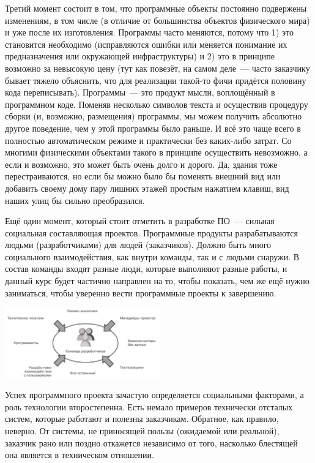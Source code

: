\documentclass{../../text-style}
\begin{document}
Третий момент состоит в том, что программные объекты постоянно подвержены изменениям, в том числе (в отличие от большинства объектов физического мира) и уже после их изготовления. Программы часто меняются, потому что 1) это становится необходимо (исправляются ошибки или меняется понимание их предназначения или окружающей инфраструктуры) и 2) это в принципе возможно за невысокую цену (тут как повезёт, на самом деле~--- часто заказчику бывает тяжело объяснить, что для реализации такой-то фичи придётся половину кода переписывать). Программы~--- это продукт мысли, воплощённый в программном коде. Поменяв несколько символов текста и осуществив процедуру сборки (и, возможно, размещения) программы, мы можем получить абсолютно другое поведение, чем у этой программы было раньше. И всё это чаще всего в полностью автоматическом режиме и практически без каких-либо затрат. Со многими физическими объектами такого в принципе осуществить невозможно, а если и возможно, это может быть очень долго и дорого. Да, здания тоже перестраиваются, но если бы можно было бы поменять внешний вид или добавить своему дому пару лишних этажей простым нажатием клавиш, вид наших улиц бы сильно преобразился. 

Ещё один момент, который стоит отметить в разработке ПО~--- сильная социальная составляющая проектов. Программные продукты разрабатываются людьми (разработчиками) для людей (заказчиков). Должно быть много социального взаимодействия, как внутри команды, так и с людьми снаружи. В состав команды входят разные люди, которые выполняют разные работы, и данный курс будет частично направлен на то, чтобы показать, чем же ещё нужно заниматься, чтобы уверенно вести программные проекты к завершению.

\begin{center}
    \includegraphics[width=0.5\textwidth]{team.png}
\end{center}

Успех программного проекта зачастую определяется социальными факторами, а роль технологии второстепенна. Есть немало примеров технически отсталых систем, которые работают и полезны заказчикам. Обратное, как правило, неверно. От системы, не приносящей пользы (ожидаемой или реальной), заказчик рано или поздно откажется независимо от того, насколько блестящей она является в техническом отношении.
\end{document}
